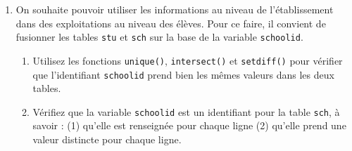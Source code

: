 \documentclass[12pt,twosided, notitlepage]{book}
\newenvironment{Shaded}{}{}
\newcommand{\KeywordTok}[1]{\textcolor[rgb]{0.00,0.00,1.00}{#1}}
\newcommand{\CommentTok}[1]{\textcolor[rgb]{0.00,0.50,0.00}{#1}}
\newcommand{\OperatorTok}[1]{#1}
\newcommand{\NormalTok}[1]{#1}
\newif \ifsol
\renewenvironment{Shaded}{\begin{snugshade}}{\end{snugshade}}
\begin{document}
\begin{enumerate}
  \bigskip  \fi 
\item
  On souhaite pouvoir utiliser les informations au niveau de
  l'établissement dans des exploitations au niveau des élèves. Pour ce
  faire, il convient de fusionner les tables \texttt{stu} et
  \texttt{sch} sur la base de la variable \texttt{schoolid}.

  \begin{enumerate}
  \def\labelenumii{\roman{enumii}.}
  \item
    Utilisez les fonctions \texttt{unique()},
    \texttt{intersect()} et
    \texttt{setdiff()} pour vérifier que
    l'identifiant \texttt{schoolid} prend bien les mêmes valeurs dans
    les deux tables.

    \ifsol 

    \begin{center} \rule{0.5\linewidth}{\linethickness}\end{center}

\begin{Shaded}
\begin{Highlighting}[]
\KeywordTok{length}\NormalTok{(}\KeywordTok{intersect}\NormalTok{(stu}\OperatorTok{$}\NormalTok{schoolid, sch}\OperatorTok{$}\NormalTok{schoolid))}
\NormalTok{  ## [1] 226}
\KeywordTok{length}\NormalTok{(}\KeywordTok{unique}\NormalTok{(stu}\OperatorTok{$}\NormalTok{schoolid))}
\NormalTok{  ## [1] 226}
\KeywordTok{length}\NormalTok{(}\KeywordTok{unique}\NormalTok{(sch}\OperatorTok{$}\NormalTok{schoolid))}
\NormalTok{  ## [1] 226}

\CommentTok{# Cela fonctionne aussi plus finement avec setdiff()}
\KeywordTok{setdiff}\NormalTok{(stu}\OperatorTok{$}\NormalTok{schoolid, sch}\OperatorTok{$}\NormalTok{schoolid)}
\NormalTok{  ## character(0)}
\CommentTok{# Aucune valeur de stu$schoolid n'est pas dans sch$schoolid}
\KeywordTok{setdiff}\NormalTok{(sch}\OperatorTok{$}\NormalTok{schoolid, stu}\OperatorTok{$}\NormalTok{schoolid)}
\NormalTok{  ## character(0)}
\CommentTok{# Aucune valeur de sch$schoolid n'est pas dans stu$schoolid}
\end{Highlighting}
\end{Shaded}

    \begin{center} \rule{0.5\linewidth}{\linethickness}\end{center}

    \bigskip  \fi 
  \item
    Vérifiez que la variable \texttt{schoolid} est un identifiant pour
    la table \texttt{sch}, à savoir : (1) qu'elle est renseignée pour
    chaque ligne (2) qu'elle prend une valeur distincte pour chaque
    ligne.


\end{enumerate}
\end{enumerate}
\end{document}
